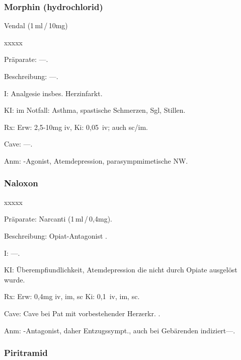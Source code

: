 \subsubsection{Morphin (hydrochlorid)}

Vendal (1\,ml\,/\,10mg)

\begin{labeling}[~]{xxxxx}
  \item[Präparate:]---.
  \item[Beschreibung:] ---.
  \item[I:]   Analgesie insbes. Herzinfarkt.
  \item[KI:]    im Notfall: Asthma, spastische Schmerzen, Sgl, Stillen.
  \item[Rx:]   Erw: 2,5-10mg iv, Ki: 0,05\, iv; auch sc/im.
  \item[Cave:] ---.
  \item[Anm:]   {\textmu}-Agonist, Atemdepression, parasympmimetische NW.
\end{labeling}







\subsubsection{Naloxon}



\begin{labeling}[~]{xxxxx}
  \item[Präparate:]  Narcanti (1\,ml\,/\,0,4mg).
  \item[Beschreibung:]   Opiat-Antagonist .
  \item[I:] ---.
  \item[KI:]   Überempfiundlichkeit, Atemdepression die nicht durch Opiate
ausgelöst wurde.
  \item[Rx:]   Erw: 0,4mg iv, im, sc\newline
Ki: 0,1\, iv, im, sc.
  \item[Cave:]  Cave bei Pat mit vorbestehender Herzerkr. .
  \item[Anm:]  {\textmu}-Antagonist, daher Entzugssympt., auch bei Gebärenden
indiziert---.
\end{labeling}





\subsubsection{Piritramid}


